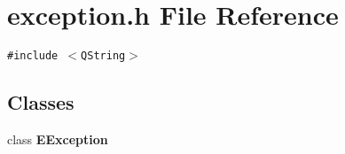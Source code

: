 \section{exception.h File Reference}
\label{exception_8h}
{\tt \#include $<$QString$>$}\par
\subsection*{Classes}
\begin{CompactItemize}
\item 
class {\bf EException}
\end{CompactItemize}
